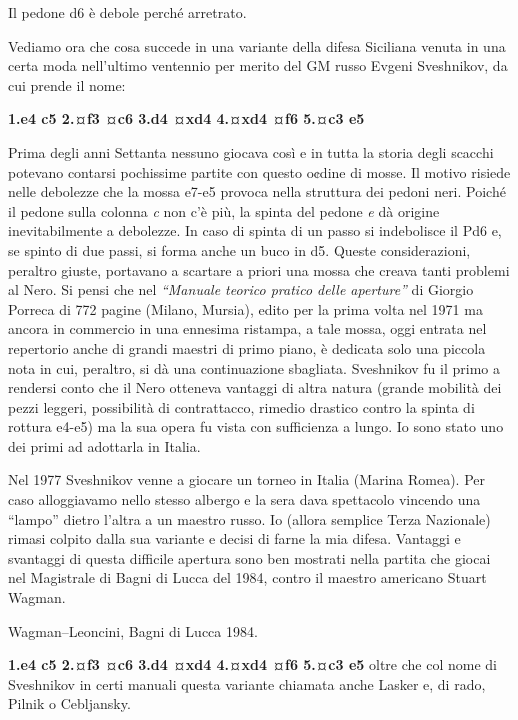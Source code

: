 Il pedone d6 è debole perché arretrato.


Vediamo ora che cosa succede in una variante della difesa Siciliana
venuta in una certa moda nell'ultimo ventennio per merito del GM russo
Evgeni Sveshnikov, da cui prende il nome:

\textbf{1.e4 c5 2.¤f3 ¤c6 3.d4 ¤xd4 4.¤xd4 ¤f6 5.¤c3 e5}


Prima degli anni Settanta nessuno giocava così e in tutta la storia
degli scacchi potevano contarsi pochissime partite con questo o¢dine di
mosse. Il motivo risiede nelle debolezze che la mossa e7-e5 provoca
nella struttura dei pedoni neri. Poiché il pedone sulla colonna \emph{c}
non c'è più, la spinta del pedone \emph{e} dà origine inevitabilmente a
debolezze. In caso di spinta di un passo si indebolisce il Pd6 e, se
spinto di due passi, si forma anche un buco in d5. Queste
considerazioni, peraltro giuste, portavano a scartare a priori una mossa
che creava tanti problemi al Nero. Si pensi che nel \emph{``Manuale
teorico pratico delle aperture''} di Giorgio Porreca di 772 pagine
(Milano, Mursia), edito per la prima volta nel 1971 ma ancora in
commercio in una ennesima ristampa, a tale mossa, oggi entrata nel
repertorio anche di grandi maestri di primo piano, è dedicata solo una
piccola nota in cui, peraltro, si dà una continuazione sbagliata.
Sveshnikov fu il primo a rendersi conto che il Nero otteneva vantaggi di
altra natura (grande mobilità dei pezzi leggeri, possibilità di
contrattacco, rimedio drastico contro la spinta di rottura e4-e5) ma la
sua opera fu vista con sufficienza a lungo. Io sono stato uno dei primi
ad adottarla in Italia.

Nel 1977 Sveshnikov venne a giocare un torneo in Italia (Marina Romea).
Per caso alloggiavamo nello stesso albergo e la sera dava spettacolo
vincendo una ``lampo'' dietro l'altra a un maestro russo. Io (allora
semplice Terza Nazionale) rimasi colpito dalla sua variante e decisi di
farne la mia difesa. Vantaggi e svantaggi di questa difficile apertura
sono ben mostrati nella partita che giocai nel Magistrale di Bagni di
Lucca del 1984, contro il maestro americano Stuart Wagman.

Wagman--Leoncini, Bagni di Lucca 1984.

\textbf{1.e4 c5 2.¤f3 ¤c6 3.d4 ¤xd4 4.¤xd4 ¤f6 5.¤c3 e5} oltre che col
nome di Sveshnikov in certi manuali questa variante chiamata anche
Lasker e, di rado, Pilnik o Cebljansky.

